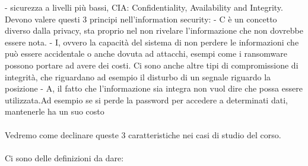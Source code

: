 \documentclass[oneside, 12pt]{extbook}
\begin{document}
- sicurezza a livelli più bassi, CIA: Confidentiality, Availability and Integrity. Devono valere questi 3 principi nell'information security:
- C è un concetto diverso dalla privacy, sta proprio nel non rivelare l'informazione che non dovrebbe essere nota.
- I, ovvero la capacità del sistema di non perdere le informazioni che può essere accidentale o anche dovuta ad attacchi, esempi come i ransomware possono portare ad avere dei costi. Ci sono anche altre tipi di compromissione di integrità, che riguardano ad esempio il disturbo di un segnale riguardo la posizione
- A, il fatto che l'informazione sia integra non vuol dire che possa essere utilizzata.Ad esempio se si perde la password per accedere a determinati dati, mantenerle ha un suo costo\\\\Vedremo come declinare queste 3 caratteristiche nei casi di studio del corso.\\\\Ci sono delle definizioni da dare:
\end{document}
